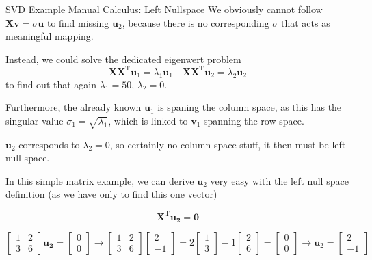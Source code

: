 \documentclass[mathserif, aspectratio=1610]{intbeamer}
\begin{document}
\begin{frame}[t]{SVD Example Manual Calculus: Left Nullspace}
We obviously cannot follow $\bm{X} \bm{v} = \sigma \bm{u}$ to find missing
$\bm{u}_2$, because there is no corresponding $\sigma$ that acts as meaningful mapping.

Instead, we could solve the dedicated eigenwert problem
$$\bm{X} \bm{X}^\mathrm{T} \bm{u}_1 = \lambda_1 \bm{u}_1\quad
\bm{X} \bm{X}^\mathrm{T} \bm{u}_2 = \lambda_2 \bm{u}_2$$
to find out that again $\lambda_1 = 50$, $\lambda_2=0$.

Furthermore, the already known $\bm{u}_1$ is spaning the column space, as this has the singular value $\sigma_1 = \sqrt{\lambda_1}$, which is linked to $\bm{v}_1$ spanning the row space.

$\bm{u}_2$ corresponds to $\lambda_2=0$, so certainly no column space stuff, it then must be left null space.

In this simple matrix example, we can derive $\bm{u}_2$ very easy with the left null space definition (as we have only to find this one vector)

$$\bm{X}^\mathrm{T} \bm{u_2} = \bm{0}$$

$$
\begin{bmatrix}
1 & 2\\
3 & 6
\end{bmatrix}
\bm{u_2}
=
\begin{bmatrix}0\\0\end{bmatrix}
\rightarrow
\begin{bmatrix}
1 & 2\\
3 & 6
\end{bmatrix}
\begin{bmatrix}2\\-1\end{bmatrix}
=
2
\begin{bmatrix}
1\\
3
\end{bmatrix}
-1
\begin{bmatrix}
2\\
6
\end{bmatrix}
=
\begin{bmatrix}0\\0\end{bmatrix}
\rightarrow
\bm{u}_2 = \begin{bmatrix}2\\-1\end{bmatrix}
$$


\end{frame}
\end{document}

